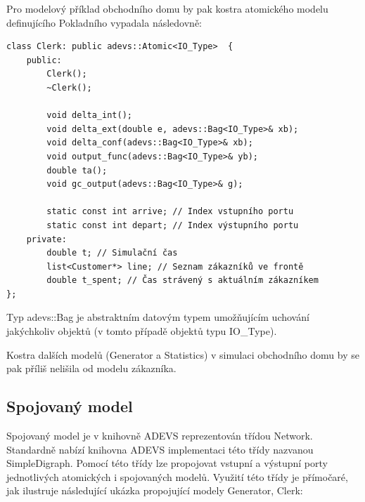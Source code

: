 Pro modelový příklad obchodního domu by pak kostra atomického modelu definujícího Pokladního vypadala následovně:

\begin{lstlisting}
class Clerk: public adevs::Atomic<IO_Type>  {
    public:
        Clerk();
        ~Clerk();

        void delta_int();
        void delta_ext(double e, adevs::Bag<IO_Type>& xb);
        void delta_conf(adevs::Bag<IO_Type>& xb);
        void output_func(adevs::Bag<IO_Type>& yb);
        double ta();
        void gc_output(adevs::Bag<IO_Type>& g);
        
        static const int arrive; // Index vstupního portu
        static const int depart; // Index výstupního portu
    private:
        double t; // Simulační čas
        list<Customer*> line; // Seznam zákazníků ve frontě
        double t_spent; // Čas strávený s aktuálním zákazníkem
};
\end{lstlisting}

Typ adevs::Bag je abstraktním datovým typem umožňujícím uchování jakýchkoliv objektů (v tomto případě objektů typu IO\_Type).

Kostra dalších modelů (Generator a Statistics) v simulaci obchodního domu by se pak příliš nelišila od modelu zákazníka.

\subsection{Spojovaný model}

Spojovaný model je v knihovně ADEVS reprezentován třídou Network. Standardně nabízí knihovna ADEVS implementaci této třídy nazvanou SimpleDigraph. Pomocí této třídy lze propojovat vstupní a výstupní porty jednotlivých atomických i spojovaných modelů. Využití této třídy je přímočaré, jak ilustruje následující ukázka propojující modely Generator, Clerk:

